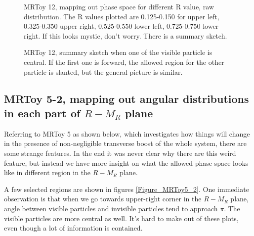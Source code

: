 \documentclass{fheadnote}
\begin{document}
\begin{landscape}
\begin{figure}[htbp]
   \caption{MRToy 12, mapping out phase space for different R value, raw distribution.
      The R values plotted are 0.125-0.150 for upper left, 0.325-0.350 upper right, 0.525-0.550 lower left, 0.725-0.750 lower right.
      If this looks mystic, don't worry.  There is a summary sketch.}
   \label{Figure_MRToy12_Raw}
\end{figure}
\end{landscape}


\begin{figure}[htbp]
   \centering
   \caption{MRToy 12, summary sketch when one of the visible particle is central.  If the first one is forward, the allowed region for the other particle
   is slanted, but the general picture is similar.}
   \label{Figure_MRToy12_Summary}
\end{figure}


\subsection{MRToy 5-2, mapping out angular distributions in each part of $R-M_R$ plane}

Referring to MRToy 5 as shown below, which investigates how things will change in the presence of non-negligible transverse boost of the whole system,
there are some strange features.  In the end it was never clear why there are this weird feature, but instead we have more insight on what the
allowed phase space looks like in different region in the $R-M_R$ plane.

A few selected regions are shown in figures \ref{Figure_MRToy5_2}.
One immediate observation is that when we go towards upper-right corner in the $R-M_R$ plane, angle between visible particles and invisible particles tend to approach $\pi$.
The visible particles are more central as well.  It's hard to make out of these plots, even though a lot of information is contained.
\end{document}
